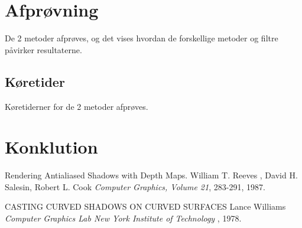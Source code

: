 \documentclass[11pt,a4paper]{article}
\begin{document}
\section{Afprøvning}
 De 2 metoder afprøves, og det vises hvordan de forskellige metoder og filtre påvirker resultaterne.	

\subsection{Køretider}
Køretiderner for de 2 metoder afprøves.

\section{Konklution}



\newpage 

\begin{thebibliography}{100} %
 
\addtolength{\leftmargin}{0.2in} %
\setlength{\itemindent}{-0.2in} 

 Rendering Antialiased Shadows with Depth Maps.
  William T. Reeves , David H. Salesin, Robert L. Cook 
  \emph{Computer Graphics, Volume 21}, 283-291, 1987.
  
 CASTING CURVED SHADOWS ON CURVED SURFACES 
  Lance Williams
  \emph{Computer Graphics Lab New York Institute of Technology }, 1978.
  
  
  
\end{thebibliography} 
\end{document}
